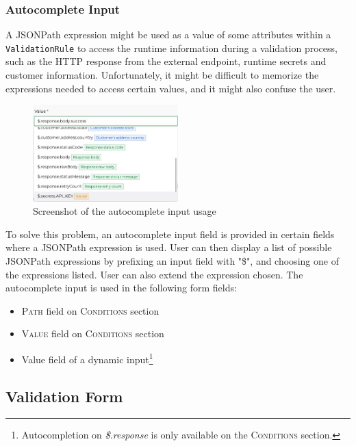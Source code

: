     \subsubsection{Autocomplete Input}

      A JSONPath expression might be used as a value of some attributes within a \verb;ValidationRule; to access the runtime information during a validation process, such as the HTTP response from the external endpoint, runtime secrets and customer information. Unfortunately, it might be difficult to memorize the expressions needed to access certain values, and it might also confuse the user. 

      \begin{figure}[!ht]
        \centering
        \includegraphics[width=0.5\textwidth]{images/ss_autocomplete.jpeg}
        \caption{Screenshot of the autocomplete input usage}
      \end{figure}

      To solve this problem, an autocomplete input field is provided in certain fields where a JSONPath expression is used. User can then display a list of possible JSONPath expressions by prefixing an input field with "\$", and choosing one of the expressions listed. User can also extend the expression chosen. The autocomplete input is used in the following form fields:

      \begin{itemize}
        \item \textsc{Path} field on \textsc{Conditions} section
        \item \textsc{Value} field on \textsc{Conditions} section
        \item Value field of a dynamic input\footnote{Autocompletion on \emph{\$.response} is only available on the \textsc{Conditions} section.}
      \end{itemize}

  \subsection{Validation Form}

